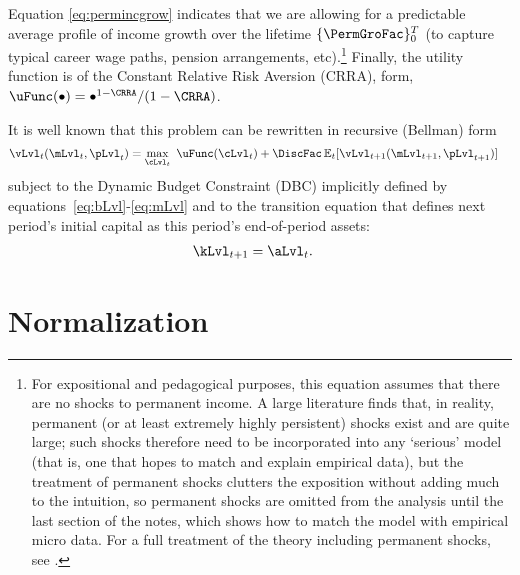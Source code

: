 \documentclass[titlepage, headings=optiontotocandhead]{Resources/texmf-local/tex/latex/econtex}
\begin{document}
Equation \eqref{eq:permincgrow} indicates that we are allowing for a predictable average profile of income growth over the lifetime $\{\PermGroFac\}_{0}^{T}$ (to capture typical career wage paths, pension arrangements, etc).\footnote{For expositional and pedagogical purposes, this equation assumes that there are no shocks to permanent income.  A large literature finds that, in reality, permanent (or at least extremely highly persistent) shocks exist and are quite large; such shocks therefore need to be incorporated into any `serious' model (that is, one that hopes to match and explain empirical data), but the treatment of permanent shocks clutters the exposition without adding much to the intuition, so permanent shocks are omitted from the analysis until the last section of the notes, which shows how to match the model with empirical micro data.  For a full treatment of the theory including permanent shocks, see \cite{BufferStockTheory}.}  Finally, the utility function is of the Constant Relative Risk Aversion (CRRA), form, $\uFunc(\bullet) = \bullet^{1-\CRRA}/(1-\CRRA)$.

It is well known that this problem can be rewritten in recursive (Bellman) form
  \begin{equation}\begin{gathered}\begin{aligned}
        {\vLvl}_{t}(\mLvl_{t},\pLvl_{t})  & = \max_{\cLvl_{t}}~ \uFunc(\cLvl_{t}) + {\DiscFac}\Ex_{t}[ {\vLvl}_{t+1}({\mLvl}_{t+1},\pLvl_{t+1})]\label{eq:vrecurse}
      \end{aligned}\end{gathered}\end{equation}
subject to the Dynamic Budget Constraint (DBC) implicitly defined by equations~\eqref{eq:bLvl}-\eqref{eq:mLvl} and to the transition equation that defines next period's initial capital as this period's end-of-period assets:
\begin{equation}\begin{gathered}\begin{aligned}
      \kLvl_{t+1} & = \aLvl_{t}. \label{eq:transitionstate}
    \end{aligned}\end{gathered}\end{equation}



\hypertarget{normalization}{}
\section{Normalization}\label{sec:normalization}
\end{document}
